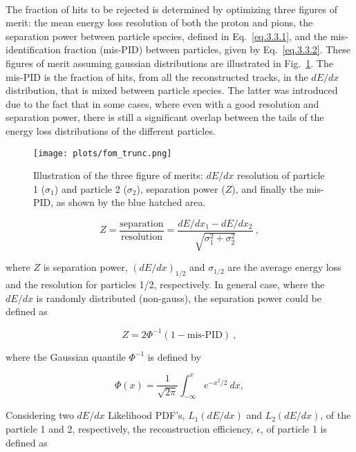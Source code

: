 ~\par The fraction of hits to be rejected is determined by optimizing three figures of merit: the mean energy loss resolution of both the proton and pions, the separation power between particle species, defined in Eq.~\ref{eq.3.3.1}, and the mis-identification fraction (mis-PID) between particles, given by Eq.~\ref{eq.3.3.2}. These figures of merit assuming gaussian distributions are illustrated in Fig.~\ref{fig.3.2.3}. The mis-PID is the fraction of hits, from all the reconstructed tracks, in the $dE/dx$ distribution, that is mixed between particle species. The latter was introduced due to the fact that in some cases, where even with a good resolution and separation power, there is still a significant overlap between the tails of the energy loss distributions of the different particles.

\begin{figure}[H]
    \centering
    \texttt{[image: plots/fom\_trunc.png]}
    \caption{\label{fig.3.2.3} Illustration of the three figure of merits: $dE/dx$ resolution of particle 1 ($\sigma_{1}$) and particle 2 ($\sigma_{2}$), separation power ($Z$), and finally the mis-PID, as shown by the blue hatched area.}
\end{figure}

\begin{equation}
    \label{eq.3.3.1}
    Z = \frac{\mathrm{separation}}{\mathrm{resolution}} = \frac{dE/dx_{1} - dE/dx_{2}}{\sqrt{\sigma_{1}^2 + \sigma_{2}^2}}~,
\end{equation}

\noindent where $Z$ is separation power, $(dE/dx)_{1/2}$ and $\sigma_{1/2}$ are the average energy loss and the resolution for particles 1/2, respectively. In general case, where the $dE/dx$ is randomly distributed (non-gauss), the separation power could be defined as 

\begin{equation}
    \label{eq.3.3.2.0.1}
    Z = 2 \Phi^{-1}(1-\mbox{mis-PID})~,
\end{equation}

\noindent where the Gaussian quantile $\Phi^{-1}$ is defined by

\begin{equation}
    \label{eq.3.3.2.0.2}
    \Phi(x) = \frac{1}{\sqrt{2\pi}}\int_{-\infty}^{x} e^{-x^{2}/2}~dx,
\end{equation}

Considering two $dE/dx$ Likelihood PDF's, $L_{1}(dE/dx)$ and $L_{2}(dE/dx)$, of the particle 1 and 2, respectively, the reconstruction efficiency, $\epsilon$, of particle 1 is defined as

